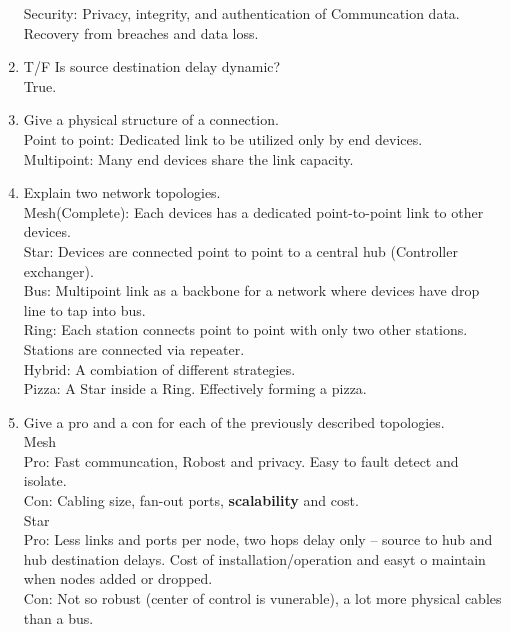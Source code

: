 \begin{enumerate}
          Security: Privacy, integrity, and authentication of Communcation data. Recovery from breaches and data loss.\\

    \item T/F Is source destination delay dynamic?\\
          True.

    \item Give a physical structure of a connection.\\
          Point to point: Dedicated link to be utilized only by end devices.\\

          Multipoint: Many end devices share the link capacity.\\



    \item Explain two network topologies.\\

          Mesh(Complete): Each devices has a dedicated point-to-point link to other devices.\\

          Star: Devices are connected point to point to a central hub (Controller exchanger).\\

          Bus: Multipoint link as a backbone for a network where devices have drop line to tap into bus.\\

          Ring: Each station connects point to point with only two other stations. Stations are connected via repeater.\\

          Hybrid: A combiation of different strategies.\\

          Pizza: A Star inside a Ring. Effectively forming a pizza.\\

    \item Give a pro and a con for each of the previously described topologies.\\
          Mesh\\
          Pro: Fast communcation, Robost and privacy. Easy to fault detect and isolate.\\
          Con: Cabling size, fan-out ports, \textbf{scalability} and cost.\\

          Star\\
          Pro: Less links and ports per node, two hops delay only -- source to hub and hub destination delays. Cost of installation/operation and easyt o maintain when
          nodes added or dropped.\\
          Con: Not so robust (center of control is vunerable),  a lot more physical cables than a bus.\\


\end{enumerate}
